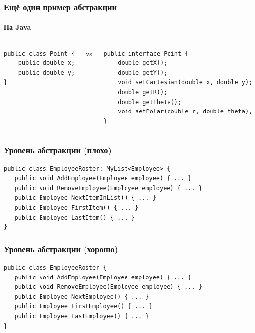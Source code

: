 \documentclass{../../slides-style}
\begin{document}
    \begin{frame}[fragile]
        \frametitle{Ещё один пример абстракции}
        \framesubtitle{На Java}
        \begin{columns}
            \begin{column}{0.32\textwidth}
                \begin{verbatim}
public class Point {
    public double x;
    public double y;
}
                \end{verbatim}
            \end{column}
            \begin{column}{0.05\textwidth}
                vs
            \end{column}
            \begin{column}{0.6\textwidth}
                \begin{verbatim}
public interface Point {
    double getX();
    double getY();
    void setCartesian(double x, double y);
    double getR();
    double getTheta();
    void setPolar(double r, double theta);
}
                \end{verbatim}
            \end{column}
        \end{columns}
    \end{frame}

    \begin{frame}[fragile]
        \frametitle{Уровень абстракции (плохо)}
        \begin{verbatim}
public class EmployeeRoster: MyList<Employee> {
   public void AddEmployee(Employee employee) { ... }
   public void RemoveEmployee(Employee employee) { ... }
   public Employee NextItemInList() { ... }
   public Employee FirstItem() { ... }
   public Employee LastItem() { ... }
}
        \end{verbatim}
    \end{frame}

    \begin{frame}[fragile]
        \frametitle{Уровень абстракции (хорошо)}
        \begin{verbatim}
public class EmployeeRoster {
   public void AddEmployee(Employee employee) { ... }
   public void RemoveEmployee(Employee employee) { ... }
   public Employee NextEmployee() { ... }
   public Employee FirstEmployee() { ... }
   public Employee LastEmployee() { ... }
}
        \end{verbatim}
    \end{frame}
\end{document}
